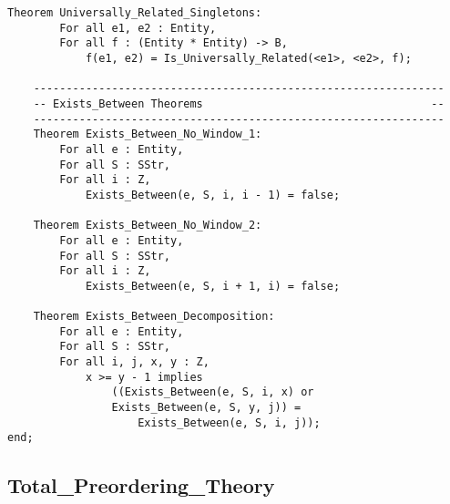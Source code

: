 \begin{lstlisting}[language=resolve]
	Theorem Universally_Related_Singletons:
		For all e1, e2 : Entity,
		For all f : (Entity * Entity) -> B,
			f(e1, e2) = Is_Universally_Related(<e1>, <e2>, f);

	---------------------------------------------------------------
	-- Exists_Between Theorems                                   --
	---------------------------------------------------------------
	Theorem Exists_Between_No_Window_1:
		For all e : Entity,
		For all S : SStr,
		For all i : Z,
			Exists_Between(e, S, i, i - 1) = false;

	Theorem Exists_Between_No_Window_2:
		For all e : Entity,
		For all S : SStr,
		For all i : Z,
			Exists_Between(e, S, i + 1, i) = false;

	Theorem Exists_Between_Decomposition:
		For all e : Entity,
		For all S : SStr,
		For all i, j, x, y : Z,
			x >= y - 1 implies
				((Exists_Between(e, S, i, x) or
				Exists_Between(e, S, y, j)) =
					Exists_Between(e, S, i, j));
end;

\end{lstlisting}

	\subsection{Total\_Preordering\_Theory}	%

